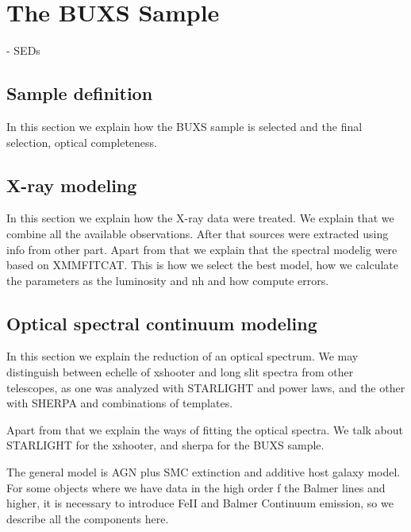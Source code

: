 
\chapter{The BUXS Sample} %
\label{chap:buxs}

         

            - SEDs
\section{Sample definition}
\label{sec3:samp}
In this section we explain how the BUXS sample is selected and the final selection, optical completeness.

\section{X-ray modeling}
\label{sec3:xray}

In this section we explain how the X-ray data were treated. We explain that we combine all the available observations. After that sources were extracted using info from other part. Apart from that we explain that the spectral modelig were based on XMMFITCAT. This is how we select the best model, how we calculate the parameters as the luminosity and nh and how compute errors.

\section{Optical spectral continuum modeling}
\label{sec3:op}

In this section we explain the reduction of an optical spectrum. We may distinguish between echelle of xshooter and long slit spectra from other telescopes, as one was analyzed with STARLIGHT and power laws, and the other with SHERPA and combinations of templates.

Apart from that we explain the ways of fitting the optical spectra. We talk about STARLIGHT for the xshooter, and sherpa for the BUXS sample.

The general model is AGN plus SMC extinction and additive host galaxy model. For some objects where we have data in the high order f the Balmer lines and higher, it is necessary to introduce FeII and Balmer Continuum emission, so we describe all the components here.


